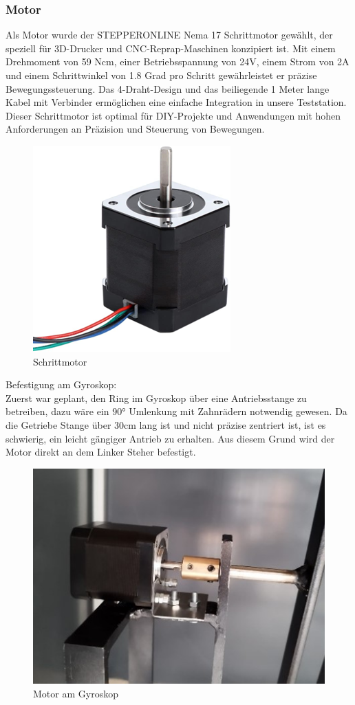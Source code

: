 \subsubsection{Motor}
Als Motor wurde der STEPPERONLINE Nema 17 Schrittmotor\autocite{Schrittmotor} gewählt, der speziell für 3D-Drucker und CNC-Reprap-Maschinen konzipiert ist. Mit einem Drehmoment von 59 Ncm, einer Betriebsspannung von 24V, einem Strom von 2A und einem Schrittwinkel von 1.8 Grad pro Schritt gewährleistet er präzise Bewegungssteuerung. Das 4-Draht-Design und das beiliegende 1 Meter lange Kabel mit Verbinder ermöglichen eine einfache Integration in unsere Teststation. Dieser Schrittmotor ist optimal für DIY-Projekte und Anwendungen mit hohen Anforderungen an Präzision und Steuerung von Bewegungen.
\begin{figure}[H]
    \centering
    \includegraphics{image/schrittmotor.png}
    \caption{Schrittmotor}
    \label{fig:enter-label}
\end{figure}
Befestigung am Gyroskop:\\
\vspace{3mm}
Zuerst war geplant, den Ring im Gyroskop über eine Antriebsstange zu betreiben, dazu wäre ein 90° Umlenkung mit Zahnrädern notwendig gewesen. Da die Getriebe Stange über 30cm lang ist und nicht präzise zentriert ist, ist es schwierig, ein leicht gängiger Antrieb zu erhalten. Aus diesem Grund wird der Motor direkt an dem Linker Steher befestigt. \\
\vspace{3mm}
\begin{figure}[H]
    \centering
    \includegraphics[scale=1.1]{image/motorgyros.jpg}
    \caption{Motor am Gyroskop}
    \label{fig:enter-label}
\end{figure}
